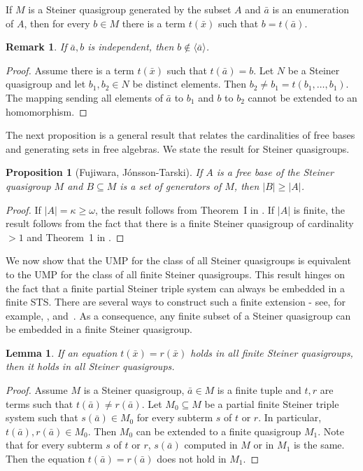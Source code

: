 \documentclass[a4paper, 11pt]{article}
\theoremstyle{note}
\newtheorem{lemma}[thm]{Lemma}
\newtheorem{rmk}[thm]{Remark}
\newtheorem{prop}[thm]{Proposition}
\begin{document}
	If $M$ is a Steiner quasigroup generated by the subset $A$ and $\bar{a}$ is an enumeration of $A$, then for every $b \in M$ there is a term $t(\bar{x})$ such that $b=t(\bar{a})$.
	
	\begin{rmk}\label{May11_1}  If $\bar{a},b$ is independent, then  $b\not\in\langle \bar{a}\rangle$.
	\end{rmk}
	\begin{proof} Assume  there is a term $t(\bar{x})$ such that $t(\bar{a})= b$. Let $N$ be a  Steiner quasigroup and let $b_1,b_2 \in N$ be distinct elements. Then $b_2\neq b_1=t(b_1,\ldots,b_1)$. The mapping sending all elements of $\bar{a}$ to $b_1$  and  $b$ to $b_2$ cannot be extended to an homomorphism.
	\end{proof}

The next proposition is a general result that relates the cardinalities of free bases and generating sets in free algebras.  We state the result for Steiner quasigroups.

\begin{prop}[Fujiwara, Jónsson-Tarski] \label{May11_2} If $A$ is a free base of the Steiner quasigroup $M$ and $B\subseteq M$ is a set of generators of $M$, then  $|B|\geq |A|$.
	\end{prop}
	\begin{proof} 
	 If $|A|=\kappa\geq \omega$, the result follows from Theorem~I in \cite{fujiwara}. If $|A|$ is finite, the result follows from the fact that there is a finite Steiner quasigroup of cardinality $>1$ and Theorem~1 in \cite{jontarski}. \end{proof}	
	
We now show that the UMP for the class of all Steiner quasigroups is equivalent to the UMP for the class of all finite Steiner quasigroups. This result hinges on the fact that a finite partial Steiner triple system can always be embedded in a finite STS. There are several ways to construct such a finite extension - see, for example,  \cite{andersenetal}, \cite{lindner} and~\cite{treash}. As a consequence, any finite subset of a Steiner quasigroup can be embedded in a finite Steiner quasigroup. 
	
	
	\begin{lemma} \label{May11_4} If an equation  $t(\bar{x})=r(\bar{x})$ holds in all finite Steiner quasigroups, then it holds in all Steiner quasigroups.
	\end{lemma}
	\begin{proof} Assume $M$ is a  Steiner quasigroup, $\bar{a}\in M$ is a finite tuple and  $t,r$ are terms such that  $t(\bar{a})\neq r(\bar{a})$.  Let   $M_0\subseteq M$ be a partial finite Steiner triple system  such that $s(\bar{a})\in M_0$ for every subterm $s$ of $t$ or $r$. In particular, $t(\bar{a}),r(\bar{a})\in M_0$. Then $M_0$ can be extended to a finite quasigroup $M_1$.  Note that for every subterm $s$ of $t$ or $r$, $s(\bar{a})$ computed in $M$ or in $M_1$ is the same. Then the equation $t(\bar{a}) = r(\bar{a})$  does not hold in $M_1$.
	\end{proof}
	
\end{document}
